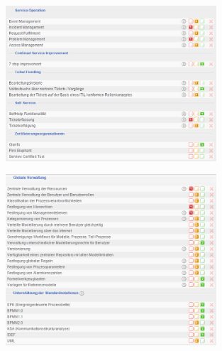 \documentclass[12pt]{article}
\begin{document}
\noindent
\begin{figure}[!h]
\centering
\includegraphics[width=0.7\textwidth]{images/tr39}
\end{figure}\FloatBarrier
\noindent
\begin{figure}[!h]
\centering
\includegraphics[width=0.7\textwidth]{images/tr40}
\end{figure}\FloatBarrier
\noindent
\end{document}
